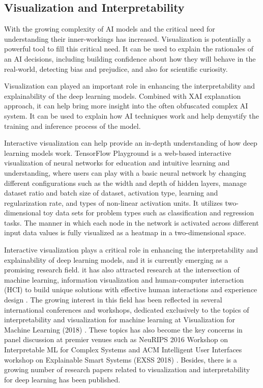 \subsection{Visualization and Interpretability}

With the growing complexity of AI models and the critical need for understanding their inner-workings has increased. Visualization is potentially a powerful tool to fill this critical need. It can be used to explain the rationales of an AI decisions, including building confidence about how they will behave in the real-world, detecting bias and prejudice, and also for scientific curiosity.

Visualization can played an important role in enhancing the interpretability and explainability of the deep learning models. Combined with XAI explanation approach, it can help bring more insight into the often obfuscated complex AI system. It can be used to explain how AI techniques work and help demystify the training and inference process of the model.

Interactive visualization can help provide an in-depth understanding of how deep learning models work. TensorFlow Playground is a web-based interactive visualization of neural networks for education and intuitive learning and understanding, where users can play with a basic neural network by changing different configurations such as the width and depth of hidden layers, manage dataset ratio and batch size of dataset, activation type, learning and regularization rate, and types of non-linear activation units. It utilizes two-dimensional toy data sets for problem types such as classification and regression tasks. The manner in which each node in the network is activated across different input data values is fully visualized as a heatmap in a two-dimensional space.

Interactive visualization plays a critical role in enhancing the interpretability and explainability of deep learning models, and it is currently emerging as a promising research field. it has also attracted research at the intersection of machine learning, information visualization and human-computer interaction (HCI) to build unique solutions with effective human interactions and experience design \cite{Dudley2018}. The growing interest in this field has been reflected in several international conferences and workshops, dedicated exclusively to the topics of interpretability and visualization for machine learning at Visualization for Machine Learning (2018) \cite{visml2018}. These topics has also become the key concerns in panel discussion at premier venues such as NeuRIPS 2016 Workshop on Interpretable ML for Complex Systems \cite{imlcs2016}and ACM Intelligent User Interfaces workshop on Explainable Smart Systems (EXSS 2018) \cite{exss2018}. Besides, there is a growing number of research papers related to visualization and interpretability for deep learning has been published.

